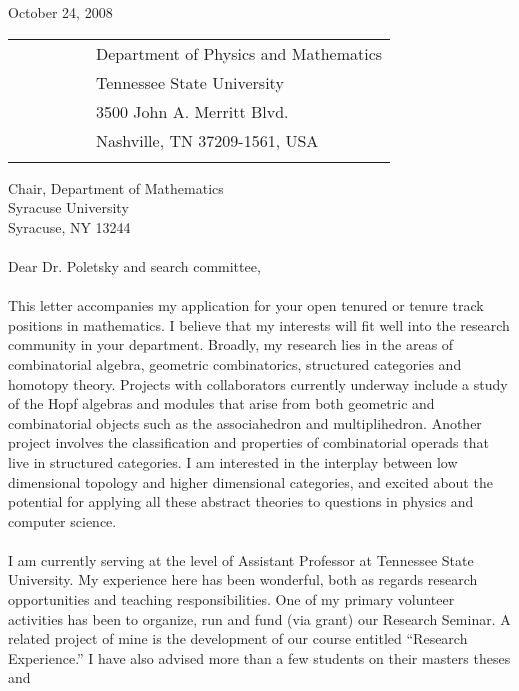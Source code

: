 \documentclass[10pt]{amsart}
\newcommand{\tubeB}{\raisebox{-.6ex}{\scalebox{.2}{\texttt{[image: ribbon.pdf]}}}}
\theoremstyle{plain}
\theoremstyle{definition}
\theoremstyle{remark}
\numberwithin{equation}{section}
\begin{document}
\noindent October 24, 2008\text{ }\text{ }\text{ }\text{ }\text{ }\text{ }\text{ }\text{ }\text{
}\text{ }\text{ }\text{ }\text{ }\text{ }\text{ }\text{ }\text{ }\ \tubeB
\begin{tabular}{llllll}\\
&&&&&Department of Physics and Mathematics  \\
&&&&&Tennessee State University \\
&&&&&3500 John A. Merritt Blvd. \\
&&&&&Nashville, TN 37209-1561, USA\\
&&&&\\
\end{tabular}
\noindent Chair, Department of Mathematics\\
 Syracuse University\\
 Syracuse, NY 13244\\
\\
Dear Dr. Poletsky and search committee,
\\\\
This letter accompanies my application for your open tenured or tenure track positions in
mathematics. I believe that my interests will fit well into the research community in your
department. Broadly, my research lies in the areas of combinatorial algebra, geometric
combinatorics, structured categories and homotopy theory. Projects with collaborators currently
underway include a study of the Hopf algebras and modules that arise from both geometric and
combinatorial objects such as the associahedron and multiplihedron. Another project involves the
classification and properties of combinatorial operads that live in structured categories. I am
interested in the interplay between low dimensional topology and higher dimensional categories, and
excited about the potential for applying all these abstract theories to questions in physics and
computer science.
\\\\
I am currently serving at the level of Assistant Professor at Tennessee State University. My
experience here has been wonderful, both as regards research opportunities and teaching
responsibilities. One of my primary volunteer activities has been to organize, run and fund (via
grant) our Research Seminar. A related project of mine is the development of our course entitled
``Research Experience.'' I have also advised more than a few students on their masters theses and
\end{document}
